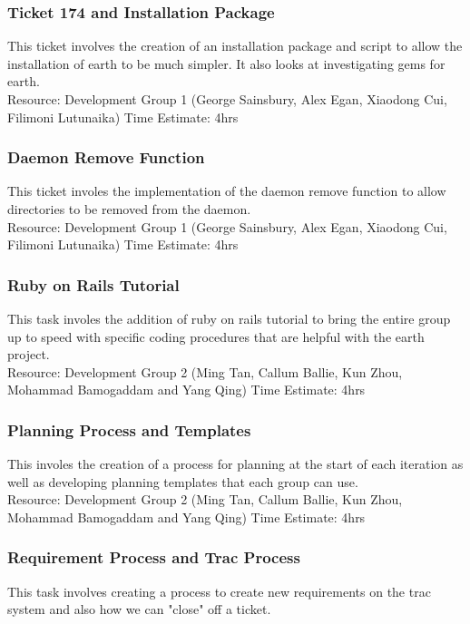 \documentclass{article}
\begin{document}
\subsubsection{Ticket 174 and Installation Package}
	This ticket involves the creation of an installation package and script to allow the installation of earth to be much simpler. It also looks at investigating gems for earth.\\

	Resource: Development Group 1 (George Sainsbury, Alex Egan, Xiaodong Cui, Filimoni Lutunaika)
	Time Estimate: 4hrs
	
\subsubsection{Daemon Remove Function}
	This ticket involes the implementation of the daemon remove function to allow directories to be removed from the daemon.\\

	Resource: Development Group 1 (George Sainsbury, Alex Egan, Xiaodong Cui, Filimoni Lutunaika)
	Time Estimate: 4hrs
	
\subsubsection{Ruby on Rails Tutorial}
	This task involes the addition of ruby on rails tutorial to bring the entire group up to speed with specific coding procedures that are helpful with the earth project.\\

	Resource: Development Group 2 (Ming Tan, Callum Ballie, Kun Zhou, Mohammad Bamogaddam and Yang Qing)
	Time Estimate: 4hrs

\subsubsection{Planning Process and Templates}
	This involes the creation of a process for planning at the start of each iteration as well as developing planning templates that each group can use.\\

	Resource: Development Group 2 (Ming Tan, Callum Ballie, Kun Zhou, Mohammad Bamogaddam and Yang Qing)
	Time Estimate: 4hrs
	
\subsubsection{Requirement Process and Trac Process}
	This task involves creating a process to create new requirements on the trac system and also how we can "close" off a ticket.\\
	
\end{document}

